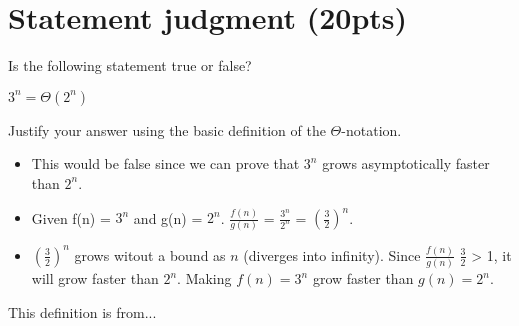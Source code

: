 \documentclass{article}[12pt]
\begin{document}
\section{Statement judgment (20pts)}
Is the following statement true or false?
\begin{center}
{$3^n = \Theta(2^n)$}
\end{center}
{Justify your answer using the basic definition of the $\Theta$-notation.}


\begin{itemize}
  \item This would be false since we can prove that $3^n$ grows asymptotically faster than $2^n$.
  \item Given f(n) = $3^n$ and g(n) = $2^n$. 
    $\frac{f(n)}{g(n)}$ = $\frac{3^n}{2^n}$ = $(\frac{3}{2})^n$.
  \item $(\frac{3}{2})^n$ grows witout a bound as $n$ \Rightarrow \infty (diverges into infinity).
    Since $\frac{f(n)}{g(n)}$ \Rightarrow $\frac{3}{2}$ > 1, it will grow faster than $2^n$.
    Making $f(n) = 3^n$ grow faster than $g(n) = 2^n$.
\end{itemize}

\newpage
\begin{thebibliography}{99}
 This definition is from...
\end{thebibliography}
\end{document}
